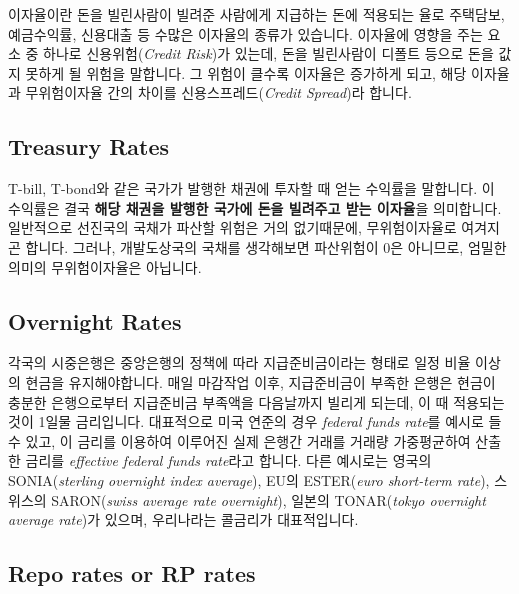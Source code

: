 \documentclass[
  letterpaper,
  DIV=11,
  numbers=noendperiod]{scrreprt}
\begin{document}

이자율이란 돈을 빌린사람이 빌려준 사람에게 지급하는 돈에 적용되는 율로
주택담보, 예금수익률, 신용대출 등 수많은 이자율의 종류가 있습니다.
이자율에 영향을 주는 요소 중 하나로 신용위험(\emph{Credit Risk})가
있는데, 돈을 빌린사람이 디폴트 등으로 돈을 값지 못하게 될 위험을
말합니다. 그 위험이 클수록 이자율은 증가하게 되고, 해당 이자율과
무위험이자율 간의 차이를 신용스프레드(\emph{Credit Spread})라 합니다.

\subsection*{Treasury Rates}\label{treasury-rates}

T-bill, T-bond와 같은 국가가 발행한 채권에 투자할 때 얻는 수익률을
말합니다. 이 수익률은 결국 \textbf{해당 채권을 발행한 국가에 돈을
빌려주고 받는 이자율}을 의미합니다. 일반적으로 선진국의 국채가 파산할
위험은 거의 없기때문에, 무위험이자율로 여겨지곤 합니다. 그러나,
개발도상국의 국채를 생각해보면 파산위험이 0은 아니므로, 엄밀한 의미의
무위험이자율은 아닙니다.

\subsection*{Overnight Rates}\label{overnight-rates}

각국의 시중은행은 중앙은행의 정책에 따라 지급준비금이라는 형태로 일정
비율 이상의 현금을 유지해야합니다. 매일 마감작업 이후, 지급준비금이
부족한 은행은 현금이 충분한 은행으로부터 지급준비금 부족액을 다음날까지
빌리게 되는데, 이 때 적용되는 것이 1일물 금리입니다. 대표적으로 미국
연준의 경우 \emph{federal funds rate}를 예시로 들 수 있고, 이 금리를
이용하여 이루어진 실제 은행간 거래를 거래량 가중평균하여 산출한 금리를
\emph{effective federal funds rate}라고 합니다. 다른 예시로는 영국의
SONIA(\emph{sterling overnight index average}), EU의 ESTER(\emph{euro
short-term rate}), 스위스의 SARON(\emph{swiss average rate overnight}),
일본의 TONAR(\emph{tokyo overnight average rate})가 있으며, 우리나라는
콜금리가 대표적입니다.

\subsection*{Repo rates or RP rates}\label{repo-rates-or-rp-rates}
\end{document}
